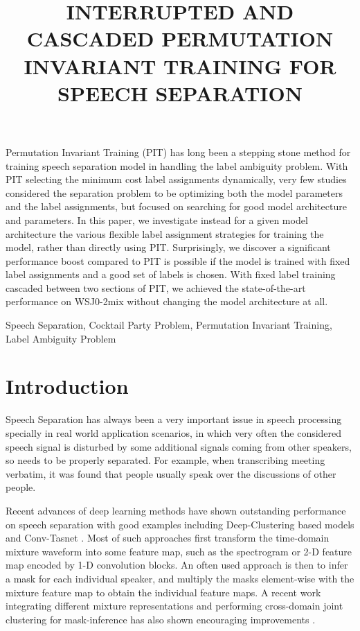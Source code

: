 \documentclass{article}
\title{INTERRUPTED AND CASCADED PERMUTATION INVARIANT TRAINING FOR SPEECH SEPARATION}
\begin{document}
\maketitle
\begin{abstract}

\end{abstract}
Permutation Invariant Training (PIT) has long been a stepping stone method for training speech separation model in handling the label ambiguity problem. With PIT selecting the minimum cost label assignments dynamically, very few studies considered the separation problem to be optimizing both the model parameters and the label assignments, but focused on searching for good model architecture and parameters. In this paper, we investigate instead for a given model architecture the various flexible label assignment strategies for training the model, rather than directly using PIT. Surprisingly, we discover a significant performance boost compared to PIT is possible if the model is trained with fixed label assignments and a good set of labels is chosen. With fixed label training cascaded between two sections of PIT, we achieved the state-of-the-art performance on WSJ0-2mix without changing the model architecture at all.

\begin{keywords}
Speech Separation, Cocktail Party Problem, Permutation Invariant Training, Label Ambiguity Problem
\end{keywords}
\vspace{-7pt}

\vspace{-7pt}
\section{Introduction}
\label{sec:intro}
\vspace{-7pt}


Speech Separation has always been a very important issue in speech processing specially in real world application scenarios, in which very often the considered speech signal is disturbed by some additional signals coming from other speakers, so needs to be properly separated. For example, when transcribing meeting verbatim, it was found that people usually speak over the discussions of other people.

Recent advances of deep learning methods have shown outstanding performance on speech separation with good examples including Deep-Clustering based models \cite{hershey2016deep,wang2018alternative,wang2018deep} and Conv-Tasnet \cite{luo2018tasnet}. Most of such approaches first transform the time-domain mixture waveform into some feature map, such as the spectrogram or 2-D feature map encoded by 1-D convolution blocks. An often used approach is then to infer a mask for each individual speaker\cite{wang2014training,luo2018speaker,wang2018end,luo2018tasnet1,isik2016single, chen2017deep}, and multiply the masks element-wise with the mixture feature map to obtain the individual feature maps. A recent work integrating different mixture representations and performing cross-domain joint clustering for mask-inference has also shown encouraging improvements \cite{Yang2019}.
\end{document}
